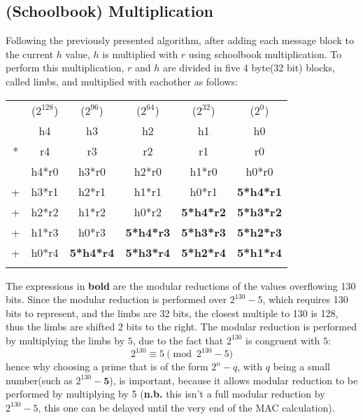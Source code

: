 \documentclass{article}
\begin{document}
\subsection{(Schoolbook) Multiplication}
Following the previously presented algorithm, after adding each message block to the current $h$ value, $h$ is multiplied with $r$ using schoolbook multiplication. 
To perform this multiplication, $r$ and $h$ are divided in five 4 byte(32 bit) blocks, called limbs\label{def_limb}, and multiplied with eachother as follows:
\begin{footnotesize}
\begin{tabular}{cccccc}
\\
    & ($2^{128}$)   & ($2^{96}$)    & ($2^{64}$)    & ($2^{32}$)    & ($2^{0}$)     \\
    & h4            & h3            & h2            & h1            & h0            \\
*   & r4            & r3            & r2            & r1            & r0            \\
\hline
    & h4*r0 & h3*r0 & h2*r0 & h1*r0 & h0*r0 \\
+   & h3*r1 & h2*r1 & h1*r1 & h0*r1 & \textbf{5*h4*r1} \\
+   & h2*r2 & h1*r2 & h0*r2 & \textbf{5*h4*r2} & \textbf{5*h3*r2} \\
+   & h1*r3 & h0*r3 & \textbf{5*h4*r3} & \textbf{5*h3*r3} & \textbf{5*h2*r3} \\
+   & h0*r4 & \textbf{5*h4*r4} & \textbf{5*h3*r4} & \textbf{5*h2*r4} & \textbf{5*h1*r4}\\
    &    &    &    &    &    \\
\end{tabular}
\end{footnotesize}
The expressions in \textbf{bold} are the modular reductions of the values overflowing 130 bits. Since the modular reduction is performed over $2^{130}-5$, which requires 130 bits
to represent, and the limbs are 32 bits, the closest multiple to 130 is 128, thus the limbs are shifted 2 bits to the right. The modular reduction is performed by multiplying the
limbs by $5$, due to the fact that $2^{130}$ is congruent with $5$:
$$2^{130} \equiv 5 \pmod{2^{130}-5}$$ 
hence why choosing a prime that is of the form $2^n-q$, with $q$ being a small number(such as $2^{130}-\textbf{5}$), is important, because it allows modular reduction to be 
performed by multiplying by 5 (\textbf{n.b.} this isn't a full modular reduction by $2^{130}-5$, this one can be delayed until the very end of the MAC calculation).
\end{document}
